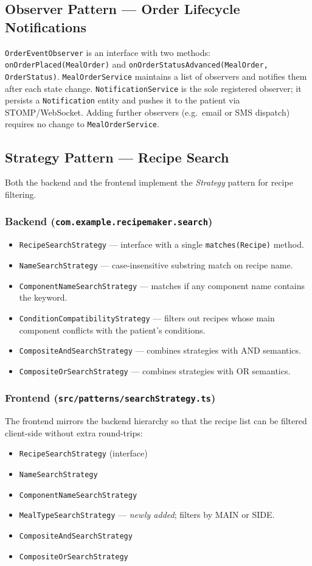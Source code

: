 \documentclass[12pt,a4paper]{article}
\begin{document}
\subsection{Observer Pattern — Order Lifecycle Notifications}
\texttt{OrderEventObserver} is an interface with two methods:
\texttt{onOrderPlaced(MealOrder)} and
\texttt{onOrderStatusAdvanced(MealOrder, OrderStatus)}.  \texttt{MealOrderService}
maintains a list of observers and notifies them after each state change.
\texttt{NotificationService} is the sole registered observer; it persists a
\texttt{Notification} entity and pushes it to the patient via STOMP/WebSocket.
Adding further observers (e.g.\ email or SMS dispatch) requires no change to
\texttt{MealOrderService}.

\subsection{Strategy Pattern — Recipe Search}
Both the backend and the frontend implement the \emph{Strategy} pattern for
recipe filtering.

\subsubsection{Backend (\texttt{com.example.recipemaker.search})}
\begin{itemize}[noitemsep]
  \item \texttt{RecipeSearchStrategy} — interface with a single \texttt{matches(Recipe)} method.
  \item \texttt{NameSearchStrategy} — case-insensitive substring match on recipe name.
  \item \texttt{ComponentNameSearchStrategy} — matches if any component name contains the keyword.
  \item \texttt{ConditionCompatibilityStrategy} — filters out recipes whose main component
        conflicts with the patient's conditions.
  \item \texttt{CompositeAndSearchStrategy} — combines strategies with AND semantics.
  \item \texttt{CompositeOrSearchStrategy} — combines strategies with OR semantics.
\end{itemize}

\subsubsection{Frontend (\texttt{src/patterns/searchStrategy.ts})}
The frontend mirrors the backend hierarchy so that the recipe list can be
filtered client-side without extra round-trips:
\begin{itemize}[noitemsep]
  \item \texttt{RecipeSearchStrategy} (interface)
  \item \texttt{NameSearchStrategy}
  \item \texttt{ComponentNameSearchStrategy}
  \item \texttt{MealTypeSearchStrategy} — \emph{newly added}; filters by MAIN or SIDE.
  \item \texttt{CompositeAndSearchStrategy}
  \item \texttt{CompositeOrSearchStrategy}
\end{itemize}
\end{document}
